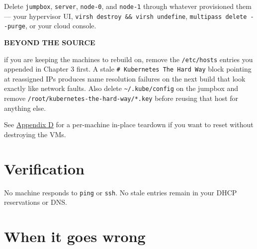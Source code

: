 \documentclass[11pt,oneside]{report}
\newcommand{\calloutlabel}[2]{{\sffamily\bfseries\footnotesize\color{#1}#2\quad}}
\begin{document}
Delete
\texttt{jumpbox},
\texttt{server},
\texttt{node-0}, and
\texttt{node-1}
through whatever
provisioned them ---
your hypervisor UI,
\texttt{virsh\ destroy\ \&\&\ virsh\ undefine},
\texttt{multipass\ delete\ -\/-purge},
or your cloud
console.

\begin{beyondbox}\calloutlabel{teal}{BEYOND THE SOURCE}

if you are keeping
the machines to
rebuild on, remove
the
\texttt{/etc/hosts}
entries you appended
in Chapter 3 first.
A stale
\texttt{\#\ Kubernetes\ The\ Hard\ Way}
block pointing at
reassigned IPs
produces name
resolution failures
on the next build
that look exactly
like network faults.
Also delete
\texttt{\textasciitilde{}/.kube/config}
on the jumpbox and
remove
\texttt{/}\allowbreak{}\texttt{root/}\allowbreak{}\texttt{kubernetes-}\allowbreak{}\texttt{the-}\allowbreak{}\texttt{hard-}\allowbreak{}\texttt{way/}\allowbreak{}\texttt{*.}\allowbreak{}\texttt{key}
before reusing that
host for anything
else.

\end{beyondbox}

See
\protect\hyperlink{app-teardown}{Appendix
D} for a per-machine
in-place teardown if
you want to reset
without destroying
the VMs.

\hypertarget{verification-11}{%
\section{Verification}\label{verification-11}}

No machine responds
to \texttt{ping} or
\texttt{ssh}. No
stale entries remain
in your DHCP
reservations or DNS.

\hypertarget{when-it-goes-wrong-12}{%
\section{When it
goes
wrong}\label{when-it-goes-wrong-12}}
\end{document}
